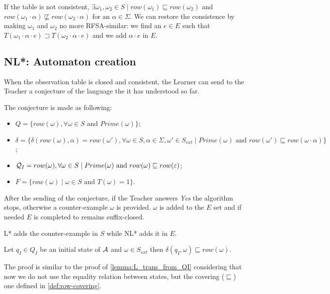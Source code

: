 If the table is not consistent, $\exists \omega_1, \omega_2 \in S \mid row(\omega_1) \sqsubseteq row(\omega_2)$ and $row(\omega_1 \cdot \alpha) \not\sqsubseteq row(\omega_2 \cdot \alpha) \text{ for an } \alpha \in \Sigma$. We can restore the consistence by making $\omega_1$ and $\omega_2$ no more RFSA-similar: we find an $e \in E$ such that $T(\omega_1 \cdot \alpha \cdot e) \sqsupset T(\omega_2 \cdot \alpha \cdot e)$ and we add $\alpha \cdot e$ in $E$.

\subsection{NL*: Automaton creation}

When the observation table is closed and consistent, the Learner can send to the Teacher a conjecture of the language the it has understood so far.

The conjecture is made as following:
\begin{itemize}
  \item $Q = \{row(\omega), \forall \omega \in S \text{ and } Prime(\omega) \}$;
  \item $\delta = \{ \delta(row(\omega), \alpha) = row(\omega'), \forall \omega \in S, \alpha \in \Sigma, \omega' \in S_{ext} \mid Prime(\omega) \text{ and } row(\omega') \sqsubseteq row(\omega \cdot \alpha)\}$;
  \item $\mathcal{Q}_I = row(\omega), \forall \omega \in S \mid Prime(\omega) \text{ and } row(\omega) \sqsubseteq row(\varepsilon) $;
  \item $F = \{row(\omega) \mid \omega \in S \text{ and } T(\omega) = 1 \}$.
\end{itemize}

After the sending of the conjecture, if the Teacher answers \textit{Yes} the algorithm stops, otherwise a counter-example $\omega$ is provided. $\omega$ is added to the $E$ set and if needed $E$ is completed to remains suffix-closed.

\begin{remark}
  L* adds the counter-example in $S$ while NL* adds it in $E$.
\end{remark}

\begin{lemma}
  Let $q_I \in Q_I$ be an initial state of $\mathcal{A}$ and $\omega \in S_{ext}$ then $\delta(q_I, \omega) \sqsubseteq row(\omega)$.
\end{lemma}

The proof is similar to the proof of \cref{lemma:L_trans_from_QI} considering that now we do not use the equality relation between states, but the covering ($\sqsubseteq$) one defined in \cref{def:row-covering}.

